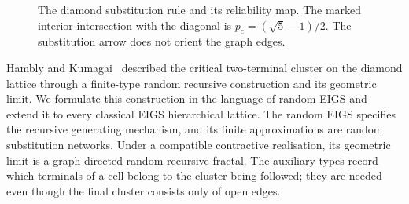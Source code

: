 \begin{figure}[tbp]
\centering
\begin{minipage}[c]{0.40\textwidth}
\centering
{}
\end{minipage}\hfill
\begin{minipage}[c]{0.55\textwidth}
\centering
{}
\end{minipage}
\caption{The diamond substitution rule and its reliability map. The marked interior intersection with the diagonal is $p_c=(\sqrt5-1)/2$. The substitution arrow does not orient the graph edges.}
\label{fig:dhl-reliability}
\end{figure}















Hambly and Kumagai~\cite{hambly2010diffusion} described the critical two-terminal cluster on the diamond lattice through a finite-type random recursive construction and its geometric limit.
We formulate this construction in the language of random EIGS and extend it to every classical EIGS hierarchical lattice.
The random EIGS specifies the recursive generating mechanism, and its finite approximations are random substitution networks. Under a compatible contractive realisation, its geometric limit is a graph-directed random recursive fractal.
The auxiliary types record which terminals of a cell belong to the cluster being followed; they are needed even though the final cluster consists only of open edges.

